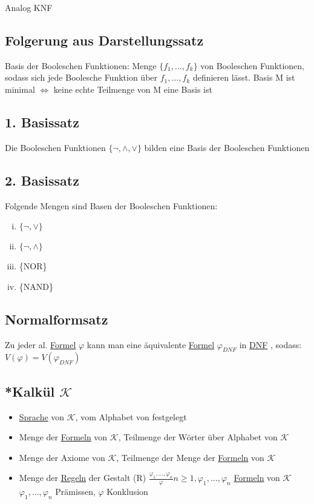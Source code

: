 \documentclass[12pt,a4paper]{article} %
\begin{document}
	Analog KNF

	\subsection{Folgerung aus Darstellungssatz}
	Basis der Booleschen Funktionen: \newline
	Menge $\{f_1, ..., f_k\}$ von Booleschen Funktionen, sodass sich jede Boolesche Funktion über $
	f_1, ..., f_k$ definieren lässt. \newline
	Basis M ist minimal $\Leftrightarrow$ keine echte Teilmenge von M eine Basis ist
	
	\subsection{1. Basissatz}
	Die Booleschen Funktionen $\{\neg, \land, \lor\}$ bilden eine Basis der Booleschen Funktionen
	
	\subsection{2. Basissatz}
	Folgende Mengen sind Basen der Booleschen Funktionen: \newline
	\begin{enumerate}[(i)]
		\item $\{\neg, \lor\}$
		\item $\{\neg, \land\}$
		\item \{NOR\}
		\item \{NAND\}
	\end{enumerate}
	
	\subsection{Normalformsatz}
	Zu jeder al. \hyperref[Formel]{Formel} $\varphi$ kann man eine äquivalente \hyperref[Formel]{Formel} $\varphi_{DNF}$ in \hyperref[DNF]{DNF} , sodass: $V(\varphi) = V(\varphi_{DNF})$
	
	\subsection{*Kalkül $\mathcal{K}$}
	\label{Kalkul}
	\begin{itemize}
		\item \hyperref[Sprache]{Sprache} von $\mathcal{K}$, vom Alphabet von festgelegt 
		\item Menge der \hyperref[Formel]{Formeln} von $\mathcal{K}$, Teilmenge der Wörter über Alphabet von $\mathcal{K}$
		\item Menge der Axiome von $\mathcal{K}$, Teilmenge der Menge der \hyperref[Formel]{Formeln} von $\mathcal{K}$
		\item Menge der \hyperref[Kalkul]{Regeln} der Gestalt \newline
		(R) $\frac{\varphi_1, ..., \varphi_n}{\varphi} n \ge 1, \varphi_1, ..., \varphi_n$ \hyperref[Formel]{Formeln} von $\mathcal{K}$ \newline
		$\varphi_1, ..., \varphi_n$ Prämissen, $\varphi$ Konklusion
	\end{itemize}
\end{document}

